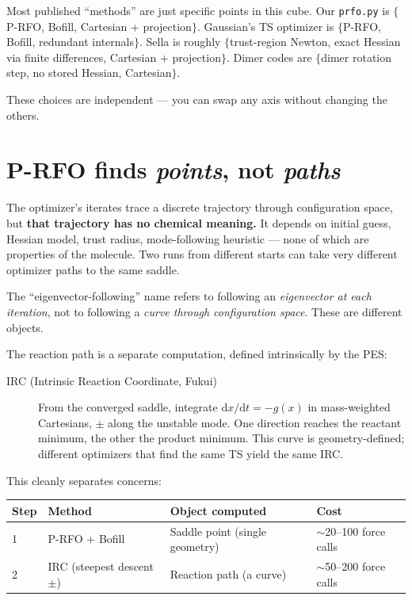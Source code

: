 \documentclass[11pt]{article}
\begin{document}
Most published ``methods'' are just specific points in this cube.  Our
\texttt{prfo.py} is $\{$P-RFO, Bofill, Cartesian + projection$\}$.  Gaussian's
TS optimizer is $\{$P-RFO, Bofill, redundant internals$\}$.  Sella is roughly
$\{$trust-region Newton, exact Hessian via finite differences, Cartesian +
projection$\}$.  Dimer codes are $\{$dimer rotation step, no stored Hessian,
Cartesian$\}$.

These choices are independent --- you can swap any axis without changing the
others.

\section{P-RFO finds \emph{points}, not \emph{paths}}

The optimizer's iterates trace a discrete trajectory through configuration
space, but \textbf{that trajectory has no chemical meaning.}  It depends on
initial guess, Hessian model, trust radius, mode-following heuristic --- none
of which are properties of the molecule.  Two runs from different starts can
take very different optimizer paths to the same saddle.

The ``eigenvector-following'' name refers to following an \emph{eigenvector at
each iteration}, not to following a \emph{curve through configuration space}.
These are different objects.

The reaction path is a separate computation, defined intrinsically by the
PES:

\begin{description}
  \item[IRC (Intrinsic Reaction Coordinate, Fukui)] From the converged saddle,
    integrate $\mathrm{d}x/\mathrm{d}t = -g(x)$ in mass-weighted Cartesians,
    $\pm$ along the unstable mode.  One direction reaches the reactant
    minimum, the other the product minimum.  This curve is geometry-defined;
    different optimizers that find the same TS yield the same IRC.
\end{description}

This cleanly separates concerns:

\begin{center}
\begin{tabular}{l l l l}
\hline
Step & Method & Object computed & Cost \\
\hline
1 & P-RFO + Bofill & Saddle point (single geometry) & $\sim$20--100 force calls \\
2 & IRC (steepest descent $\pm$) & Reaction path (a curve) & $\sim$50--200 force calls \\
\hline
\end{tabular}
\end{center}
\end{document}
